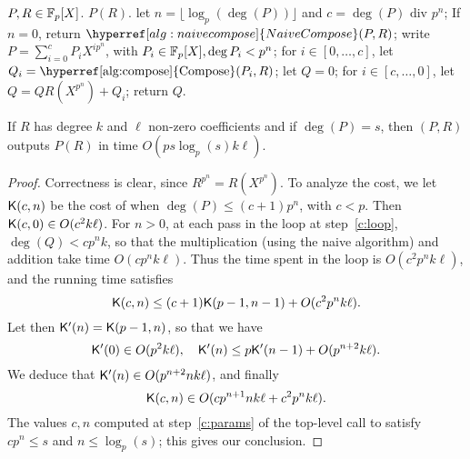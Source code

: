 \begin{algorithm}
  \caption{\label{alg:compose}}
  \begin{algorithmic}[1]
    \REQUIRE $P,R\in\mathbb{F}_p[X]$.
    \ENSURE $P(R)$.
    \STATE\label{c:params} let $n=\lfloor \log_p(\deg(P)) \rfloor$ and $c=\deg(P) \text{ div } p^n$;
    \STATE If $n=0$, return $\hyperref[alg:naivecompose]{\alg{NaiveCompose}}(P,R)$;
    \STATE write $P=\sum_{i=0}^{c} P_i X^{ip^n}$, with $P_i \in \mathbb{F}_p[X], \deg P_i<p^n$;
    \STATE for $i\in [0,\dots,c]$, let $Q_i = \text{\hyperref[alg:compose]{\alg{Compose}}}(P_i,R)$;
    \STATE let $Q=0$;
    \STATE\label{c:loop} for $i\in [c,\dots,0]$, let $Q = Q R(X^{p^n})  + Q_i$;
    \STATE return $Q$.
  \end{algorithmic}
\end{algorithm}


\begin{theorem}
  \label{theo:comp}
  If $R$ has degree $k$ and $\ell$ non-zero coefficients and if
  $\deg(P)=s$, then \hyperref[alg:compose]{}$(P,R)$ outputs $P(R)$ in time $O(ps
  \log_p(s)k\ell)$.
\end{theorem}
\begin{proof}
  Correctness is clear, since $R^{p^n}=R(X^{p^n})$. To analyze the
  cost, we let $\mathsf{K}(c,n)$ be the cost of {\hyperref[alg:compose]{}} when
  $\deg(P)\le (c+1)p^n$, with $c<p$. Then $\mathsf{K}(c,0) \in O(c^2k\ell)$.
  For $n > 0$, at each pass in the loop at step~\ref{c:loop}, $\deg(Q)
  < cp^n k$, so that the multiplication (using the naive algorithm)
  and addition take time $O(cp^nk\ell)$. Thus the time spent in the
  loop is $O(c^2p^{n}k\ell)$, and the running time
  satisfies
  \begin{equation}
    \label{eq:70}
    \mathsf{K}(c,n) \le (c+1)\mathsf{K}(p-1,n-1) + O(c^2p^nk\ell)
    \text{.}    
  \end{equation}
  Let then $\mathsf{K}'(n)=\mathsf{K}(p-1,n)$, so that we have
  \begin{equation}
    \label{eq:71}
    \mathsf{K}'(0) \in O(p^2k\ell), \quad \mathsf{K}'(n) \le p\mathsf{K}'(n-1) +
    O(p^{n+2}k\ell)
    \text{.}  
  \end{equation}
  We deduce that $\mathsf{K}'(n) \in O(p^{n+2}nk\ell)$,
  and finally
  \begin{equation}
    \label{eq:72}
    \mathsf{K}(c,n) \in O(cp^{n+1}nk\ell + c^2p^nk\ell)
    \text{.}  
  \end{equation}
  The values $c,n$ computed at step~\ref{c:params} of the top-level
  call to \hyperref[alg:compose]{} satisfy $cp^n\le s$ and $n\le\log_p (s)$; this
  gives our conclusion.
\end{proof}

